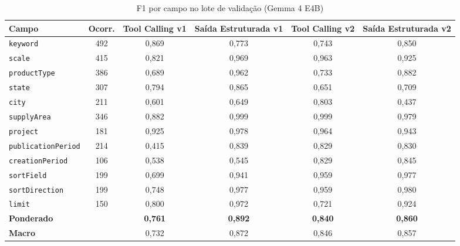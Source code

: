 \begin{table}[htbp!]
\centering
\caption{F1 por campo no lote de validação (Gemma 4 E4B)}
\label{tab:lote_campos}
\footnotesize
\begin{tabular}{|l|c|c|c|c|c|}
\hline
\textbf{Campo} & \textbf{Ocorr.} & \textbf{Tool Calling v1} & \textbf{Saída Estruturada v1} & \textbf{Tool Calling v2} & \textbf{Saída Estruturada v2} \\
\hline
\texttt{keyword} & 492 & 0,869 & 0,773 & 0,743 & 0,850 \\
\texttt{scale} & 415 & 0,821 & 0,969 & 0,963 & 0,925 \\
\texttt{productType} & 386 & 0,689 & 0,962 & 0,733 & 0,882 \\
\texttt{state} & 307 & 0,794 & 0,865 & 0,651 & 0,709 \\
\texttt{city} & 211 & 0,601 & 0,649 & 0,803 & 0,437 \\
\texttt{supplyArea} & 346 & 0,882 & 0,999 & 0,999 & 0,979 \\
\texttt{project} & 181 & 0,925 & 0,978 & 0,964 & 0,943 \\
\texttt{publicationPeriod} & 214 & 0,415 & 0,839 & 0,829 & 0,830 \\
\texttt{creationPeriod} & 106 & 0,538 & 0,545 & 0,829 & 0,845 \\
\texttt{sortField} & 199 & 0,699 & 0,941 & 0,959 & 0,977 \\
\texttt{sortDirection} & 199 & 0,748 & 0,977 & 0,959 & 0,980 \\
\texttt{limit} & 150 & 0,800 & 0,972 & 0,721 & 0,924 \\
\hline
\textbf{Ponderado} & & \textbf{0,761} & \textbf{0,892} & \textbf{0,840} & \textbf{0,860} \\
\textbf{Macro} & & 0,732 & 0,872 & 0,846 & 0,857 \\
\hline
\end{tabular}
\end{table}
